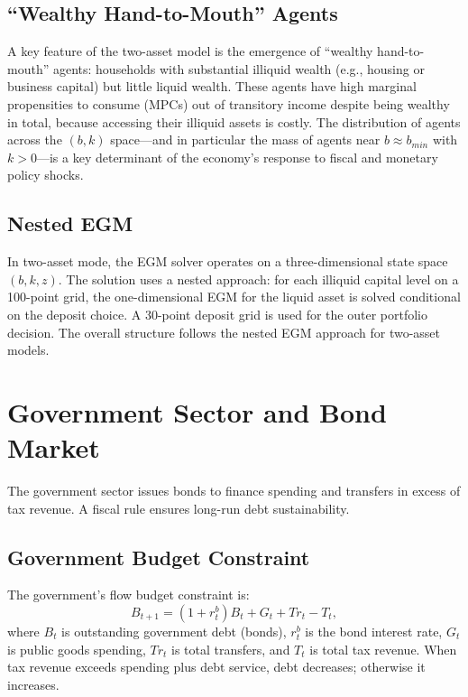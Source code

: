 \documentclass[12pt]{article}
\begin{document}
\subsection{``Wealthy Hand-to-Mouth'' Agents}

A key feature of the two-asset model is the emergence of ``wealthy hand-to-mouth'' agents: households with substantial illiquid wealth (e.g., housing or business capital) but little liquid wealth. These agents have high marginal propensities to consume (MPCs) out of transitory income despite being wealthy in total, because accessing their illiquid assets is costly. The distribution of agents across the $(b, k)$ space---and in particular the mass of agents near $b \approx b_{min}$ with $k > 0$---is a key determinant of the economy's response to fiscal and monetary policy shocks.

\subsection{Nested EGM}

In two-asset mode, the EGM solver operates on a three-dimensional state space $(b, k, z)$. The solution uses a nested approach: for each illiquid capital level on a 100-point grid, the one-dimensional EGM for the liquid asset is solved conditional on the deposit choice. A 30-point deposit grid is used for the outer portfolio decision. The overall structure follows the nested EGM approach for two-asset models.


\section{Government Sector and Bond Market}\label{sec:government}

The government sector issues bonds to finance spending and transfers in excess of tax revenue. A fiscal rule ensures long-run debt sustainability.

\subsection{Government Budget Constraint}

The government's flow budget constraint is:
\begin{equation}\label{eq:govt_budget}
  B_{t+1} = (1 + r^b_t) B_t + G_t + Tr_t - T_t,
\end{equation}
where $B_t$ is outstanding government debt (bonds), $r^b_t$ is the bond interest rate, $G_t$ is public goods spending, $Tr_t$ is total transfers, and $T_t$ is total tax revenue. When tax revenue exceeds spending plus debt service, debt decreases; otherwise it increases.
\end{document}
